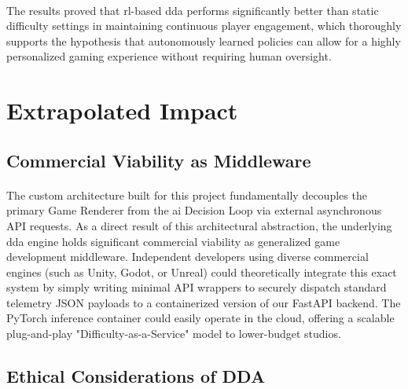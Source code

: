 \paragraph{} The results proved that \ac{rl}-based \ac{dda} performs significantly better than static difficulty settings in maintaining continuous player engagement, which thoroughly supports the hypothesis that autonomously learned policies can allow for a highly personalized gaming experience without requiring human oversight.

\section{Extrapolated Impact}

\subsection{Commercial Viability as Middleware}
\paragraph{} The custom architecture built for this project fundamentally decouples the primary Game Renderer from the \ac{ai} Decision Loop via external asynchronous API requests. As a direct result of this architectural abstraction, the underlying \ac{dda} engine holds significant commercial viability as generalized game development middleware. Independent developers using diverse commercial engines (such as Unity, Godot, or Unreal) could theoretically integrate this exact system by simply writing minimal API wrappers to securely dispatch standard telemetry JSON payloads to a containerized version of our FastAPI backend. The PyTorch inference container could easily operate in the cloud, offering a scalable plug-and-play "Difficulty-as-a-Service" model to lower-budget studios.

\subsection{Ethical Considerations of DDA}
